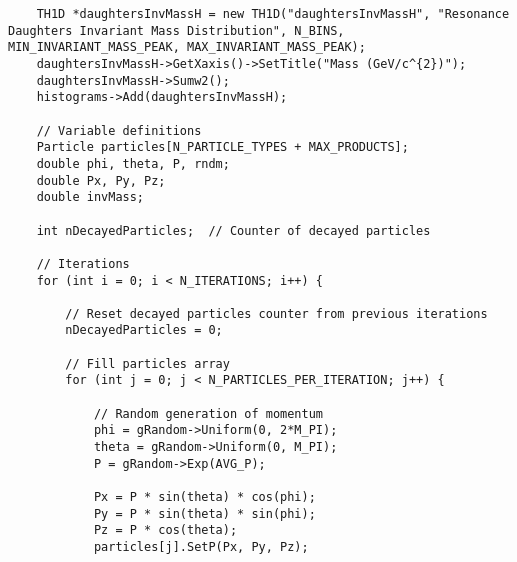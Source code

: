 \documentclass{article}
\begin{document}
\begin{verbatim}
    TH1D *daughtersInvMassH = new TH1D("daughtersInvMassH", "Resonance Daughters Invariant Mass Distribution", N_BINS, MIN_INVARIANT_MASS_PEAK, MAX_INVARIANT_MASS_PEAK);
    daughtersInvMassH->GetXaxis()->SetTitle("Mass (GeV/c^{2})");
    daughtersInvMassH->Sumw2();
    histograms->Add(daughtersInvMassH);

    // Variable definitions
    Particle particles[N_PARTICLE_TYPES + MAX_PRODUCTS];
    double phi, theta, P, rndm;
    double Px, Py, Pz;
    double invMass;

    int nDecayedParticles;  // Counter of decayed particles

    // Iterations
    for (int i = 0; i < N_ITERATIONS; i++) {

        // Reset decayed particles counter from previous iterations
        nDecayedParticles = 0;

        // Fill particles array
        for (int j = 0; j < N_PARTICLES_PER_ITERATION; j++) {

            // Random generation of momentum
            phi = gRandom->Uniform(0, 2*M_PI);
            theta = gRandom->Uniform(0, M_PI);
            P = gRandom->Exp(AVG_P);

            Px = P * sin(theta) * cos(phi);
            Py = P * sin(theta) * sin(phi);
            Pz = P * cos(theta);
            particles[j].SetP(Px, Py, Pz);


\end{verbatim}
\end{document}
